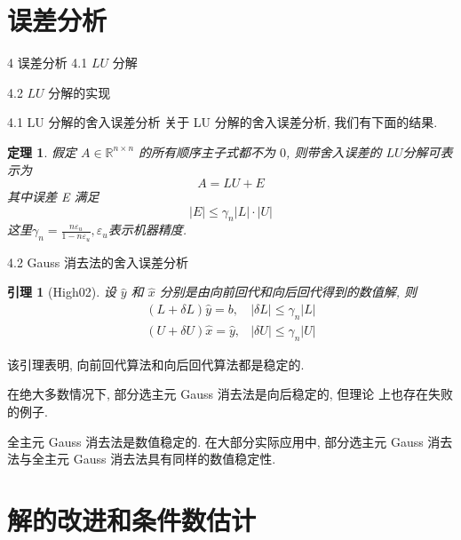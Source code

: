 \documentclass[notheorems,serif]{beamer}
\newcommand{\hei}[1]{{\HEI#1}}
\newtheorem{theorem}{\hei{定理}}
\newtheorem{lemma}{\hei{引理}}
\begin{document}
\section{误差分析}

\begin{frame}{4 \quad 误差分析}
4.1 \qquad$LU$ 分解

4.2 \qquad$LU$ 分解的实现
\end{frame}


\begin{frame}{4.1 \quad LU 分解的舍入误差分析}
关于 LU 分解的舍入误差分析, 我们有下面的结果.

\begin{theorem}
	假定 $A ∈ \mathbb{R}^{n×n}$ 的所有顺序主子式都不为 $0$, 则带舍入误差的 $LU$分解可表示为
	\begin{equation}
	A=L U+E
	\end{equation}
	其中误差 E 满足
	\begin{equation}
	|E| \leq \gamma_{n}|L| \cdot|U|
	\end{equation}
	这里$\gamma_{n}=\frac{n \varepsilon_{u}}{1-n \varepsilon_{u}}, \varepsilon_{u}$表示机器精度.
\end{theorem}
\end{frame}

\begin{frame}{4.2 \quad Gauss 消去法的舍入误差分析}
\begin{lemma}[High02] 设 $\hat{y}$ 和 $\hat{x}$ 分别是由向前回代和向后回代得到的数值解, 则
	\begin{equation}
	\begin{array}{ll}{(L+\delta L) \hat{y}=b,} & {|\delta L| \leq \gamma_{n}|L|} \\ {(U+\delta U) \hat{x}=\hat{y},} & {|\delta U| \leq \gamma_{n}|U|}\end{array}
	\end{equation}
\end{lemma}


该引理表明, 向前回代算法和向后回代算法都是稳定的.

{\red{$\dagger$}}在绝大多数情况下, 部分选主元 Gauss 消去法是向后稳定的, 但理论
上也存在失败的例子.

{\red{$\dagger$}}全主元 Gauss 消去法是数值稳定的. 在大部分实际应用中, 部分选主元 Gauss 消去法与全主元 Gauss 消去法具有同样的数值稳定性.
\end{frame}

\section{解的改进和条件数估计}
\end{document}
